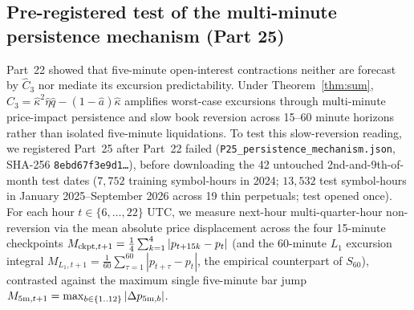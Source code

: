 \subsection{Pre-registered test of the multi-minute persistence mechanism (Part 25)}\label{sec:p25}
Part~22 showed that five-minute open-interest contractions neither are forecast by $\hat C_3$ nor mediate its excursion predictability. Under Theorem~\ref{thm:sum}, $\hat C_3=\hat\kappa^2\hat\eta\hat q-(1-\hat a)\hat\kappa$ amplifies worst-case excursions through multi-minute price-impact persistence and slow book reversion across 15--60 minute horizons rather than isolated five-minute liquidations. To test this slow-reversion reading, we registered Part~25 after Part~22 failed (\texttt{P25\_persistence\_mechanism.json}, SHA-256 \texttt{8ebd67f3e9d1\ldots}), before downloading the 42 untouched 2nd-and-9th-of-month test dates ($7{,}752$ training symbol-hours in 2024; $13{,}532$ test symbol-hours in January 2025--September 2026 across 19 thin perpetuals; test opened once). For each hour $t\in\{6,\dots,22\}$ UTC, we measure next-hour multi-quarter-hour non-reversion via the mean absolute price displacement across the four 15-minute checkpoints $M_{{\rm ckpt},t+1}=\frac{1}{4}\sum_{k=1}^4|p_{t+15k}-p_t|$ (and the 60-minute $L_1$ excursion integral $M_{L_1,t+1}=\frac{1}{60}\sum_{\tau=1}^{60}|p_{t+\tau}-p_t|$, the empirical counterpart of $S_{60}$), contrasted against the maximum single five-minute bar jump $M_{5{\rm m},t+1}=\max_{b\in\{1..12\}}|\Delta p_{5{\rm m},b}|$.

